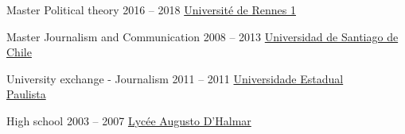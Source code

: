 \begin{yearlist}[7.1][0.7][3.4]

\item[Master Political theory]{2016 -- 2018}
     {
     \href{https://formations.univ-rennes1.fr/formations/master-2-theorie-politique}{Université de Rennes 1}
     }
     {}
                        
                        

\item[Master Journalism and Communication]{2008 -- 2013}
     {
     \href{http://periodismo.usach.cl/} {Universidad de Santiago de Chile}
     }
     {}


\item[University exchange - Journalism]{2011 -- 2011}
     {
     \href{http://www.unesp.br/} {Universidade Estadual \\ Paulista}
     }
     {}
     
     
\item[High school ]{2003 \hspace{-0.06cm}-- \hspace{-0.06cm}2007}
     {
     \href{www.liceoaugustodhalmar.cl/liceo}{Lycée Augusto D'Halmar}
     }
		 {}		     


\end{yearlist}





%
%



